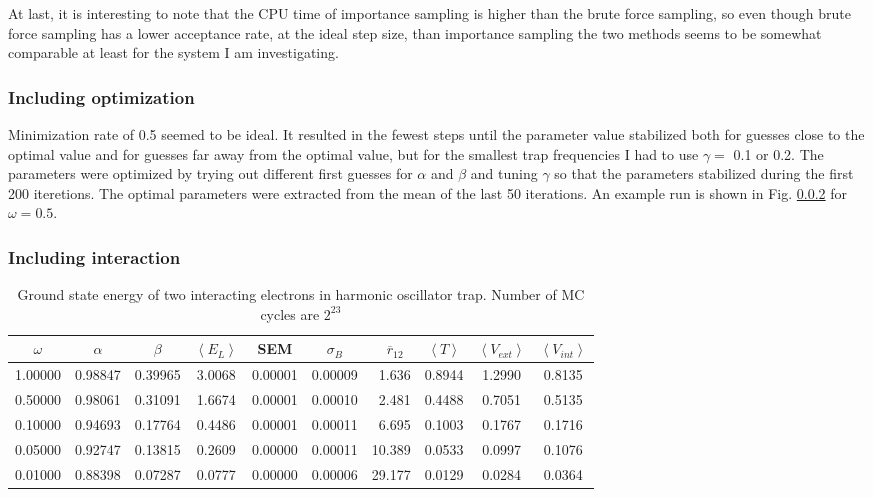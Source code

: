 At last, it is interesting to note that the CPU time of importance sampling is higher than the brute force sampling, so even though brute force sampling has a lower acceptance rate, at the ideal step size, than importance sampling the two methods seems to be somewhat comparable at least for the system I am investigating.


\subsubsection{Including optimization}

Minimization rate of 0.5 seemed to be ideal. It resulted in the fewest steps until the parameter value stabilized both for guesses close to the optimal value and for guesses far away from the optimal value, but for the smallest trap frequencies I had to use $\gamma = $ 0.1 or 0.2. The parameters were optimized by trying out different first guesses for $\alpha$ and $\beta$ and tuning $\gamma$ so that the parameters stabilized during the first 200 iteretions. The optimal parameters were extracted from the mean of the last 50 iterations. An example run is shown in Fig. \ref{} for $\omega = 0.5$.

\subsubsection{Including interaction}

\begin{table}[H]\caption{Ground state energy of two interacting electrons in harmonic oscillator trap. Number of MC cycles are $2^{23}$}\label{tab:ground_state_energy_brute_force_interaction}
\center
\begin{tabular}{c|cccccrccc}
$\omega$ & $\alpha$ & $\beta$ & $\left< E_L \right>$ & SEM & $\sigma_B$ &  $\overline{r}_{12} \,\,\,$ & $\left< T \right>$  & $\left< V_{ext}\right>$ & $\left<V_{int} \right>$  \\ \hline
1.00000 & 0.98847 & 0.39965 & 3.0068 & 0.00001 & 0.00009 & 1.636 & 0.8944 & 1.2990 & 0.8135\\
0.50000 & 0.98061 & 0.31091 & 1.6674 & 0.00001 & 0.00010 & 2.481 & 0.4488 & 0.7051 & 0.5135\\
0.10000 & 0.94693 & 0.17764 & 0.4486 & 0.00001 & 0.00011 & 6.695 & 0.1003 & 0.1767 & 0.1716\\
0.05000 & 0.92747 & 0.13815 & 0.2609 & 0.00000 & 0.00011 & 10.389 & 0.0533 & 0.0997 & 0.1076\\
0.01000 & 0.88398 & 0.07287 & 0.0777 & 0.00000 & 0.00006 & 29.177 & 0.0129 & 0.0284 & 0.0364\\
\end{tabular}
\end{table}

